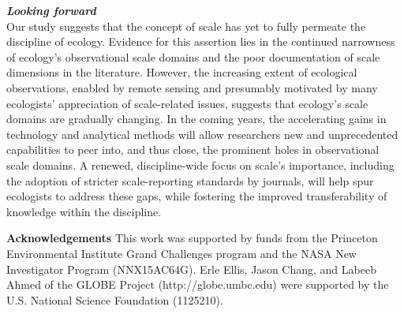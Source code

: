 \documentclass[12pt]{article}
\begin{document}
\noindent \textbf{\emph{Looking forward}}\\
Our study suggests that the concept of scale has yet to fully permeate the discipline of ecology. Evidence for this assertion lies in the continued narrowness of ecology's observational scale domains and the poor documentation of scale dimensions in the literature. However, the increasing extent of ecological observations, enabled by remote sensing and presumably motivated by many ecologists' appreciation of scale-related issues, suggests that ecology's scale domains are gradually changing. In the coming years, the accelerating gains in technology and analytical methods will allow researchers new and unprecedented capabilities to peer into, and thus close, the prominent holes in observational scale domains. A renewed, discipline-wide focus on scale's importance, including the adoption of stricter scale-reporting standards by journals, will help spur ecologists to address these gaps, while fostering the improved transferability of knowledge within the discipline.  





\noindent \textbf{Acknowledgements} This work was supported by funds from the Princeton Environmental Institute Grand Challenges program and the NASA New Investigator Program (NNX15AC64G). Erle Ellis, Jason Chang, and Labeeb Ahmed of the GLOBE Project (http://globe.umbc.edu) were supported by the U.S. National Science Foundation (1125210).
\clearpage
\end{document}
